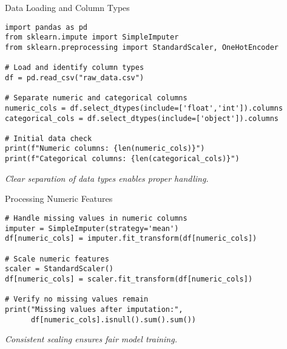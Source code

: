 \documentclass[aspectratio=169]{beamer}
\begin{document}
\begin{frame}[fragile]{Data Loading and Column Types}
\begin{verbatim}
import pandas as pd
from sklearn.impute import SimpleImputer
from sklearn.preprocessing import StandardScaler, OneHotEncoder

# Load and identify column types
df = pd.read_csv("raw_data.csv")

# Separate numeric and categorical columns
numeric_cols = df.select_dtypes(include=['float','int']).columns
categorical_cols = df.select_dtypes(include=['object']).columns

# Initial data check
print(f"Numeric columns: {len(numeric_cols)}")
print(f"Categorical columns: {len(categorical_cols)}")
\end{verbatim}

\emph{Clear separation of data types enables proper handling.}
\end{frame}


\begin{frame}[fragile]{Processing Numeric Features}
\begin{verbatim}
# Handle missing values in numeric columns
imputer = SimpleImputer(strategy='mean')
df[numeric_cols] = imputer.fit_transform(df[numeric_cols])

# Scale numeric features
scaler = StandardScaler()
df[numeric_cols] = scaler.fit_transform(df[numeric_cols])

# Verify no missing values remain
print("Missing values after imputation:",
      df[numeric_cols].isnull().sum().sum())
\end{verbatim}

\emph{Consistent scaling ensures fair model training.}
\end{frame}

\end{document}
